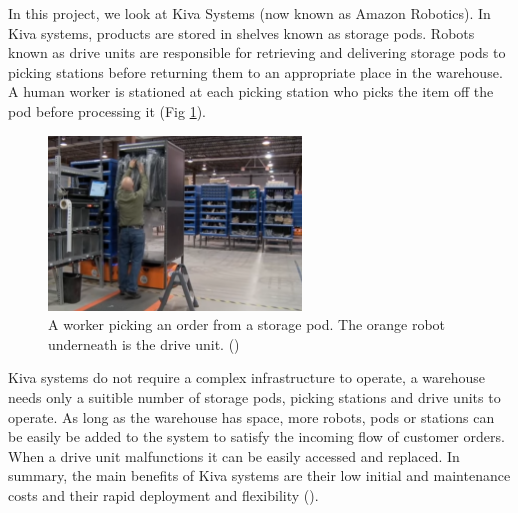 \documentclass[a4paper,11pt]{article}
\begin{document}
In this project, we look at Kiva Systems (now known as Amazon Robotics). In Kiva systems, products are stored in shelves known as storage pods. Robots known as drive units are responsible for retrieving and delivering storage pods to picking stations before returning them to an appropriate place in the warehouse. A human worker is stationed at each picking station who picks the item off the pod before processing it (Fig \ref{kivaprocess}).

\begin{figure}[h!]
	\centering
	\includegraphics[width=0.6\textwidth ]{graphics/kivaprocess}
	\caption{A worker picking an order from a storage pod. The orange robot underneath is the drive unit. (\cite{kivayoutube2010quietlogistics})}
	\label{kivaprocess}
\end{figure}


Kiva systems do not require a complex infrastructure to operate, a warehouse needs only a suitible number of storage pods, picking stations and drive units to operate. As long as the warehouse has space, more robots, pods or stations can be easily be added to the system to satisfy the incoming flow of customer orders. When a drive unit malfunctions it can be easily accessed and replaced. In summary, the main benefits of Kiva systems are their low initial and maintenance costs and their rapid deployment and flexibility (\cite{wurman2008coordinating}).
\end{document}
